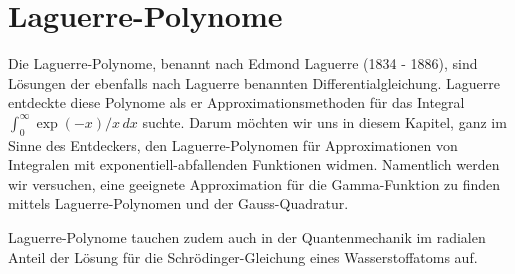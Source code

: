 %
%
%
\chapter{Laguerre-Polynome\label{chapter:laguerre}}
\begin{refsection}

{\parindent0pt Die} Laguerre\--Polynome, 
benannt nach Edmond Laguerre (1834 - 1886),
sind Lösungen der ebenfalls nach Laguerre benannten Differentialgleichung.
Laguerre entdeckte diese Polynome als er Approximationsmethoden 
für das Integral $\int_0^\infty \exp(-x) / x \, dx$ suchte.
Darum möchten wir uns in diesem Kapitel, 
ganz im Sinne des Entdeckers,
den Laguerre-Polynomen für Approximationen von Integralen mit 
exponentiell-abfallenden Funktionen widmen.
Namentlich werden wir versuchen, 
eine geeignete Approximation für die Gamma-Funktion zu finden 
mittels Laguerre-Polynomen und der Gauss-Quadratur.

Laguerre-Polynome tauchen zudem auch in der Quantenmechanik im radialen Anteil 
der Lösung für die Schrödinger-Gleichung eines Wasserstoffatoms auf.





% 
% 

\printbibliography[heading=subbibliography]
\end{refsection}
